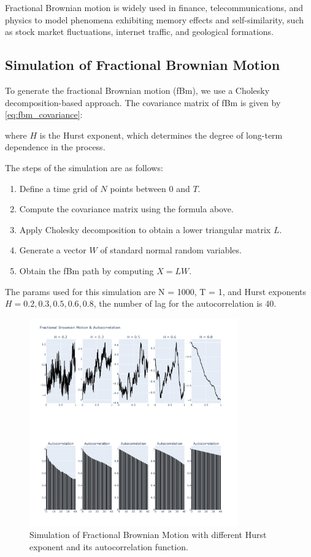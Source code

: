 \documentclass[11pt]{extarticle}
\begin{document}
Fractional Brownian motion is widely used in finance, telecommunications, and physics to model phenomena exhibiting memory effects and self-similarity, such as stock market fluctuations, internet traffic, and geological formations.


\subsection{Simulation of Fractional Brownian Motion}

To generate the fractional Brownian motion (fBm), we use a Cholesky decomposition-based approach. The covariance matrix of fBm is given by \eqref{eq:fbm_covariance}:

where \( H \) is the Hurst exponent, which determines the degree of long-term dependence in the process.

The steps of the simulation are as follows:
\begin{enumerate}
    \item Define a time grid of \( N \) points between \( 0 \) and \( T \).
    \item Compute the covariance matrix using the formula above.
    \item Apply Cholesky decomposition to obtain a lower triangular matrix \( L \).
    \item Generate a vector \( W \) of standard normal random variables.
    \item Obtain the fBm path by computing \( X = L W \).
\end{enumerate}

The params used for this simulation are N = 1000, T = 1, and Hurst exponents \( H = 0.2, 0.3, 0.5, 0.6, 0.8 \), the number
of lag for the autocorrelation is 40.

\begin{figure}[!ht]
    \centering
    \includegraphics[width=0.8\textwidth]{img/fdm_autocorr}
    \caption{Simulation of Fractional Brownian Motion with different Hurst exponent and its autocorrelation function.}
    \label{fig:fbm_autocorr}
\end{figure}
\end{document}
